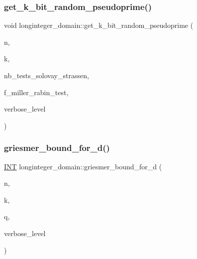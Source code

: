 \subsubsection{\texorpdfstring{get\+\_\+k\+\_\+bit\+\_\+random\+\_\+pseudoprime()}{get\_k\_bit\_random\_pseudoprime()}}
{\footnotesize\ttfamily void longinteger\+\_\+domain\+::get\+\_\+k\+\_\+bit\+\_\+random\+\_\+pseudoprime (\begin{DoxyParamCaption}\item[{\mbox{\hyperlink{classlonginteger__object}{longinteger\+\_\+object}} \&}]{n,  }\item[{\mbox{\hyperlink{galois_8h_a09fddde158a3a20bd2dcadb609de11dc}{I\+NT}}}]{k,  }\item[{\mbox{\hyperlink{galois_8h_a09fddde158a3a20bd2dcadb609de11dc}{I\+NT}}}]{nb\+\_\+tests\+\_\+solovay\+\_\+strassen,  }\item[{\mbox{\hyperlink{galois_8h_a09fddde158a3a20bd2dcadb609de11dc}{I\+NT}}}]{f\+\_\+miller\+\_\+rabin\+\_\+test,  }\item[{\mbox{\hyperlink{galois_8h_a09fddde158a3a20bd2dcadb609de11dc}{I\+NT}}}]{verbose\+\_\+level }\end{DoxyParamCaption})}

\mbox{\label{classlonginteger__domain_a9e445ab1e63c282ef07c6c5a06e00fd8}} 
\subsubsection{\texorpdfstring{griesmer\+\_\+bound\+\_\+for\+\_\+d()}{griesmer\_bound\_for\_d()}}
{\footnotesize\ttfamily \mbox{\hyperlink{galois_8h_a09fddde158a3a20bd2dcadb609de11dc}{I\+NT}} longinteger\+\_\+domain\+::griesmer\+\_\+bound\+\_\+for\+\_\+d (\begin{DoxyParamCaption}\item[{\mbox{\hyperlink{galois_8h_a09fddde158a3a20bd2dcadb609de11dc}{I\+NT}}}]{n,  }\item[{\mbox{\hyperlink{galois_8h_a09fddde158a3a20bd2dcadb609de11dc}{I\+NT}}}]{k,  }\item[{\mbox{\hyperlink{galois_8h_a09fddde158a3a20bd2dcadb609de11dc}{I\+NT}}}]{q,  }\item[{\mbox{\hyperlink{galois_8h_a09fddde158a3a20bd2dcadb609de11dc}{I\+NT}}}]{verbose\+\_\+level }\end{DoxyParamCaption})}

